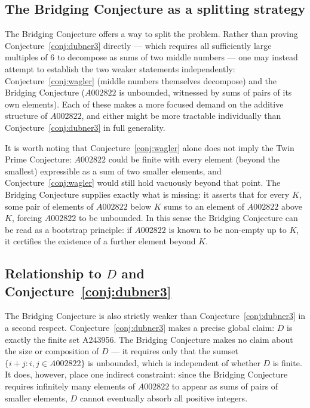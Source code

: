\documentclass[12pt]{amsart}
\theoremstyle{definition}
\begin{document}
\subsection*{The Bridging Conjecture as a splitting strategy}

The Bridging Conjecture offers a way to split the problem. Rather than proving
Conjecture~\ref{conj:dubner3} directly — which requires all sufficiently large multiples
of $6$ to decompose as sums of two middle numbers — one may instead attempt to establish
the two weaker statements independently: Conjecture~\ref{conj:wagler} (middle numbers
themselves decompose) and the Bridging Conjecture ($A002822$ is unbounded, witnessed by
sums of pairs of its own elements).
Each of these makes a more focused demand on the additive structure of $A002822$, and
either might be more tractable individually than Conjecture~\ref{conj:dubner3} in full
generality.

It is worth noting that Conjecture~\ref{conj:wagler} alone does not imply the Twin Prime
Conjecture: $A002822$ could be finite with every element (beyond the smallest) expressible
as a sum of two smaller elements, and Conjecture~\ref{conj:wagler} would still hold
vacuously beyond that point. The Bridging Conjecture supplies exactly what is missing: it
asserts that for every $K$, some pair of elements of $A002822$ below $K$ sums to an
element of $A002822$ above $K$, forcing $A002822$ to be unbounded. In this sense the
Bridging Conjecture can be read as a bootstrap principle: if $A002822$ is known to be
non-empty up to $K$, it certifies the existence of a further element beyond $K$.

\subsection*{Relationship to $D$ and Conjecture~\ref{conj:dubner3}}

The Bridging Conjecture is also strictly weaker than Conjecture~\ref{conj:dubner3} in a
second respect. Conjecture~\ref{conj:dubner3} makes a precise global claim: $D$ is
exactly the finite set A243956. The Bridging Conjecture makes no claim about the size or
composition of $D$ — it requires only that the sumset $\{ i + j : i, j \in A002822 \}$
is unbounded, which is independent of whether $D$ is finite. It does, however, place one
indirect constraint: since the Bridging Conjecture requires infinitely many elements of
$A002822$ to appear as sums of pairs of smaller elements, $D$ cannot eventually absorb
all positive integers.
\end{document}
